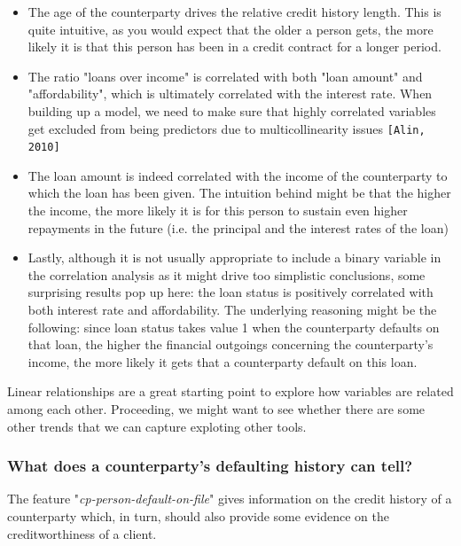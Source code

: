 \documentclass[a4paper,12pt]{article}
\begin{document}
    \begin{itemize}
        \item 
        The age of the counterparty drives the relative credit history length. 
        This is quite intuitive, as you would expect that the older a person gets, 
        the more likely it is that this person has been in a credit contract for a longer period.
        \item 
        The ratio "loans over income" is correlated with both "loan amount" and "affordability", 
        which is ultimately correlated with the interest rate.
         When building up a model, we need to make sure that highly 
         correlated variables get excluded from being predictors due to
         multicollinearity issues \texttt{[Alin, 2010]}
        \item The 
        loan amount is indeed correlated with the income of the counterparty
        to which the loan has been given. The intuition behind might 
        be that the higher the income, the more likely it is for this person 
        to sustain even higher repayments in the future 
        (i.e. the principal and the interest rates of the loan)
        \item 
        Lastly, although it is not usually appropriate to include a binary variable in the 
        correlation analysis as it might drive too simplistic conclusions, 
        some surprising results pop up here: the loan status is positively 
        correlated with both interest rate and affordability. 
        The underlying reasoning might be the following:
         since loan status takes value 1 when the counterparty defaults on that loan, 
         the higher the financial outgoings concerning the counterparty's income, 
         the more likely it gets that a counterparty default on this loan.
    \end{itemize}

    Linear relationships are a great starting point to explore how variables are related among each other. 
    Proceeding, we might want to see whether there are some other trends that we can capture exploting other tools. 
    

    \subsubsection{What does a counterparty's defaulting history can tell?}
    The feature "\textit{cp-person-default-on-file}" gives information on the credit history of a counterparty which, in turn, 
    should also provide some evidence on the creditworthiness of a client. 
   
\end{document}
